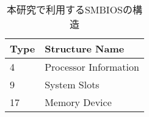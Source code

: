 \begin{table}[H]
	\begin{center}
    \caption{本研究で利用するSMBIOSの構造}
    \label{tb-smbios}
    	\begin{tabular}{l|l}
		Type & Structure Name \\ \hline\hline 
        4 & Processor Information \\ \hline
        9 & System Slots \\ \hline
        17 & Memory Device \\
		\end{tabular}
	\end{center}
\end{table}